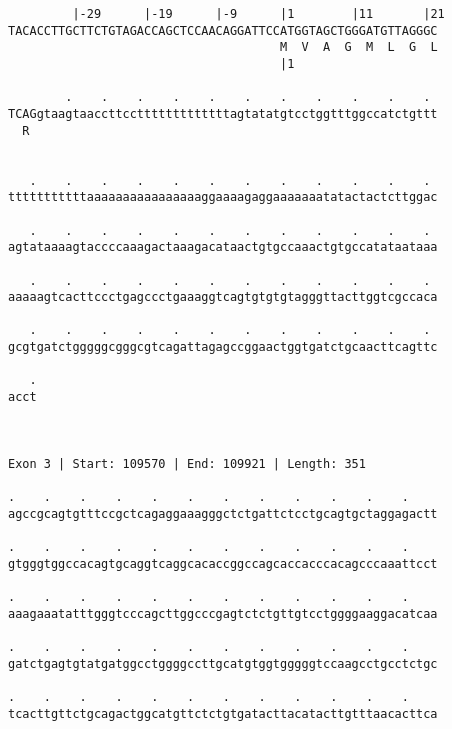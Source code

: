\documentclass{article}
\begin{document}
\begin{Verbatim}
         |-29      |-19      |-9      |1        |11       |21
TACACCTTGCTTCTGTAGACCAGCTCCAACAGGATTCCATGGTAGCTGGGATGTTAGGGC
                                      M  V  A  G  M  L  G  L
                                      |1                    
  
        .    .    .    .    .    .    .    .    .    .    . 
TCAGgtaagtaaccttcctttttttttttttagtatatgtcctggtttggccatctgttt
  R                                                         
                                                            
  
   .    .    .    .    .    .    .    .    .    .    .    . 
tttttttttttaaaaaaaaaaaaaaaaggaaaagaggaaaaaaatatactactcttggac
                                                            
   .    .    .    .    .    .    .    .    .    .    .    . 
agtataaaagtaccccaaagactaaagacataactgtgccaaactgtgccatataataaa
                                                            
   .    .    .    .    .    .    .    .    .    .    .    . 
aaaaagtcacttccctgagccctgaaaggtcagtgtgtgtagggttacttggtcgccaca
                                                            
   .    .    .    .    .    .    .    .    .    .    .    . 
gcgtgatctgggggcgggcgtcagattagagccggaactggtgatctgcaacttcagttc
                                                            
   .
acct
    
    
 
Exon 3 | Start: 109570 | End: 109921 | Length: 351
 
.    .    .    .    .    .    .    .    .    .    .    .    
agccgcagtgtttccgctcagaggaaagggctctgattctcctgcagtgctaggagactt
                                                            
.    .    .    .    .    .    .    .    .    .    .    .    
gtgggtggccacagtgcaggtcaggcacaccggccagcaccacccacagcccaaattcct
                                                            
.    .    .    .    .    .    .    .    .    .    .    .    
aaagaaatatttgggtcccagcttggcccgagtctctgttgtcctggggaaggacatcaa
                                                            
.    .    .    .    .    .    .    .    .    .    .    .    
gatctgagtgtatgatggcctggggccttgcatgtggtgggggtccaagcctgcctctgc
                                                            
.    .    .    .    .    .    .    .    .    .    .    .    
tcacttgttctgcagactggcatgttctctgtgatacttacatacttgtttaacacttca
                                                            

\end{Verbatim}
\end{document}

